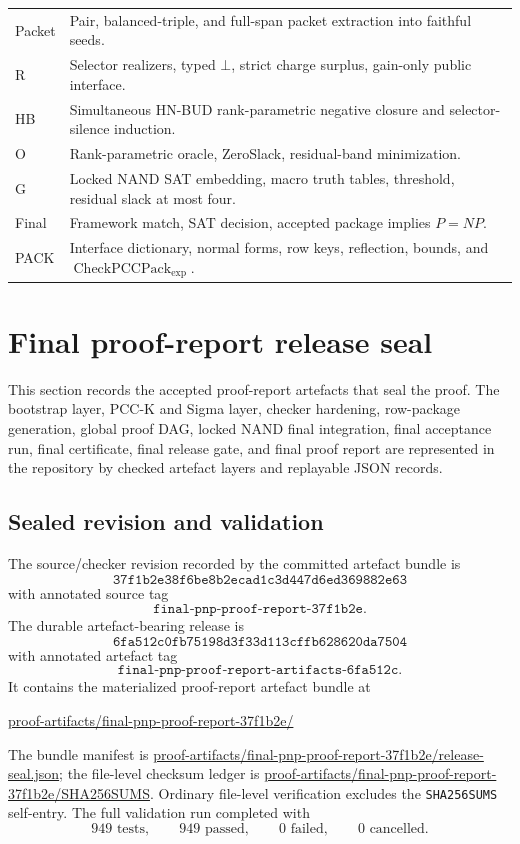 \documentclass[10.5pt,a4paper]{article}
\newcommand{\CheckPack}{\operatorname{CheckPCCPack}_{\exp}}
\newcommand{\Bot}{\bot}
\begin{document}
\begin{longtable}{>{\raggedright\arraybackslash}p{}p{}}
Packet & Pair, balanced-triple, and full-span packet extraction into faithful seeds.\\
R & Selector realizers, typed \(\Bot\), strict charge surplus, gain-only public interface.\\
HB & Simultaneous HN-BUD rank-parametric negative closure and selector-silence induction.\\
O & Rank-parametric oracle, ZeroSlack, residual-band minimization.\\
G & Locked NAND SAT embedding, macro truth tables, threshold, residual slack at most four.\\
Final & Framework match, SAT decision, accepted package implies \(P=NP\).\\
PACK & Interface dictionary, normal forms, row keys, reflection, bounds, and \(\CheckPack\).\\
\bottomrule
\end{longtable}


\section{Final proof-report release seal}\label{sec:final-proof-report}

This section records the accepted proof-report artefacts that seal the proof.  The bootstrap layer, PCC-K and Sigma layer, checker hardening, row-package generation, global proof DAG, locked NAND final integration, final acceptance run, final certificate, final release gate, and final proof report are represented in the repository by checked artefact layers and replayable JSON records.

\subsection{Sealed revision and validation}
The source/checker revision recorded by the committed artefact bundle is
\[
\texttt{37f1b2e38f6be8b2ecad1c3d447d6ed369882e63}
\]
with annotated source tag
\[
\texttt{final-pnp-proof-report-37f1b2e}.
\]
The durable artefact-bearing release is
\[
\texttt{6fa512c0fb75198d3f33d113cffb628620da7504}
\]
with annotated artefact tag
\[
\texttt{final-pnp-proof-report-artifacts-6fa512c}.
\]
It contains the materialized proof-report artefact bundle at
\begin{center}
\url{proof-artifacts/final-pnp-proof-report-37f1b2e/}
\end{center}
The bundle manifest is \url{proof-artifacts/final-pnp-proof-report-37f1b2e/release-seal.json}; the file-level checksum ledger is \url{proof-artifacts/final-pnp-proof-report-37f1b2e/SHA256SUMS}.  Ordinary file-level verification excludes the \texttt{SHA256SUMS} self-entry.  The full validation run completed with
\[
949\text{ tests},\qquad 949\text{ passed},\qquad 0\text{ failed},\qquad 0\text{ cancelled}.
\]
\end{document}
